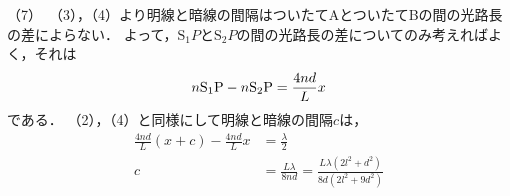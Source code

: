 \noindent （7）\,
（3），（4）より明線と暗線の間隔はついたてAとついたてBの間の光路長の差によらない．
よって，$\text{S}_1P$と$\text{S}_2P$の間の光路長の差についてのみ考えればよく，それは
\begin{align*}
  n\text{S}_1\P-n\text{S}_2\P = \frac{4nd}{L}x
\end{align*}
である．
（2），（4）と同様にして明線と暗線の間隔$c$は，
\begin{align*}
  \frac{4nd}{L}(x+c)-\frac{4nd}{L}x &= \frac{\lambda}{2} \\
  c &= \frac{L\lambda}{8nd} = \frac{L\lambda (2l^2+d^2)}{8d(2l^2+9d^2)}
\end{align*}
